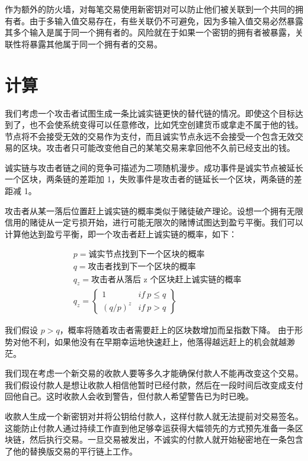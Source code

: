 \documentclass{article}
\begin{document}
作为额外的防火墙，对每笔交易使用新密钥对可以防止他们被关联到一个共同的拥有者。由于多输入值交易存在，有些关联仍不可避免，因为多输入值交易必然暴露其多个输入是属于同一个拥有者的。风险就在于如果一个密钥的拥有者被暴露，关联性将暴露其他属于同一个拥有者的交易。

\section{计算}

我们考虑一个攻击者试图生成一条比诚实链更快的替代链的情况。即使这个目标达到了，也不会使系统变得可以任意修改，比如凭空创建货币或拿走不属于他的钱。节点将不会接受无效的交易作为支付，而且诚实节点永远不会接受一个包含无效交易的区块。攻击者只可能改变他自己的某笔交易来拿回他不久前已经支出的钱。

诚实链与攻击者链之间的竞争可描述为二项随机漫步。成功事件是诚实节点被延长一个区块，两条链的差距加 1，失败事件是攻击者的链延长一个区块，两条链的差距减 1。

攻击者从某一落后位置赶上诚实链的概率类似于赌徒破产理论。设想一个拥有无限信用的赌徒从一定亏损开始，进行可能无限次的赌博试图达到盈亏平衡。我们可以计算他达到盈亏平衡，即一个攻击者赶上诚实链的概率，如下\cite{Feller}：

\begin{align*}
  & p = \text{诚实节点找到下一个区块的概率}            \\
  & q = \text{攻击者找到下一个区块的概率}              \\
  & q_z = \text{攻击者从落后 z 个区块赶上诚实链的概率} \\
  & q_z =                                              
 \begin{Bmatrix}
  1         & if \ p \leq q \\
  (q / p)^z & if \ p > q    
 \end{Bmatrix}
\end{align*}


我们假设 $p > q$，概率将随着攻击者需要赶上的区块数增加而呈指数下降。 由于形势对他不利，如果他没有在早期幸运地快速赶上，他落得越远赶上的机会就越渺茫。

我们现在考虑一个新交易的收款人要等多久才能确保付款人不能再改变这个交易。我们假设付款人是想让收款人相信他暂时已经付款，然后在一段时间后改变成支付回他自己。这时收款人会收到警告，但付款人希望警告已为时已晚。

收款人生成一个新密钥对并将公钥给付款人，这样付款人就无法提前对交易签名。这能防止付款人通过持续工作直到他足够幸运获得大幅领先的方式预先准备一条区块链，然后执行交易。一旦交易被发出，不诚实的付款人就开始秘密地在一条包含了他的替换版交易的平行链上工作。
\end{document}
